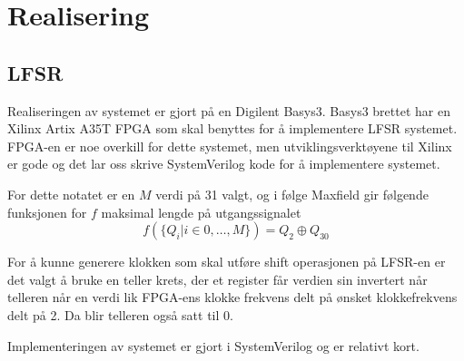 \section{Realisering}
\label{realisering}

\subsection{LFSR}
Realiseringen av systemet er gjort på en Digilent Basys3. Basys3 brettet har en Xilinx Artix A35T FPGA som skal
benyttes for å implementere LFSR systemet. FPGA-en er noe overkill for dette systemet, men utviklingsverktøyene til Xilinx
er gode og det lar oss skrive SystemVerilog kode for å implementere systemet.

For dette notatet er en $M$ verdi på 31 valgt, og i følge Maxfield \cite{maxfield} gir følgende funksjonen 
for $f$ maksimal lengde på utgangssignalet
\[
    f(\{Q_i | i \in {0, \dots, M}\}) = Q_2 \oplus Q_{30}
\]

For å kunne generere klokken som skal utføre shift operasjonen på LFSR-en er det valgt å bruke en teller krets, der 
et register får verdien sin invertert når telleren når en verdi lik FPGA-ens klokke frekvens delt på
ønsket klokkefrekvens delt på 2. Da blir telleren også satt til 0.

Implementeringen av systemet er gjort i SystemVerilog og er relativt kort. 

